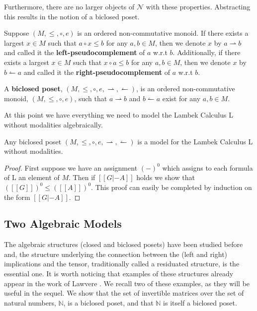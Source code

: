 \documentclass{llncs}
\newcommand{\N}{\mathcal{N}}
\newcommand{\rto}{\leftharpoonup}
\newcommand{\lto}{\rightharpoonup}
\begin{document}
Furthermore, there are no larger objects of $\N$ with these
properties.  Abstracting this results in the notion of a biclosed
poset.
\begin{definition}
  \label{def:biclosed-poset}
  Suppose $(M, \leq, \circ, e)$ is an ordered non-commutative monoid.
  If there exists a largest $x \in M$ such that $a \circ x \leq b$ for
  any $a, b \in M$, then we denote $x$ by $a \lto b$ and called it
  the \textbf{left-pseudocomplement} of $a$ w.r.t $b$.  Additionally,
  if there exists a largest $x \in M$ such that $x \circ a \leq b$ for
  any $a, b \in M$, then we denote $x$ by $b \rto a$ and called it
  the \textbf{right-pseudocomplement} of $a$ w.r.t $b$.

  A \textbf{biclosed poset}, $(M, \leq, \circ, e, \lto, \rto)$, is an  ordered non-commutative monoid, $(M, \leq, \circ, e)$, such that $a
  \lto b$ and $b \rto a$ exist for any $a,b \in M$.
\end{definition}

At this point we have everything we need to model the Lambek Calculus L without modalities algebraically.
\begin{lemma}
  \label{lemma:biclosed-poset-model-L}
  Any biclosed poset $(M, \leq, \circ, e, \lto, \rto)$ is a model for  the Lambek Calculus L without modalities.
\end{lemma}
\begin{proof}
  First suppose we have an assignment $(-)^0$ which assigns to each
  formula of L an element of $M$.  Then if $[[G |- A]]$ holds we
  show that $([[G]])^0 \leq ([[A]])^0$.  This proof can easily be
  completed by induction on the form $[[G |- A]]$.  
\end{proof}

\subsection{Two  Algebraic Models}
\label{subsec:two_example_algebraic_models}

The algebraic structures (closed and biclosed posets) have been studied before and, the structure underlying the
connection between the (left and right) implications and the tensor, traditionally  called a residuated structure, is the essential one. It is worth noticing that  examples of these structures already appear in the work of Lawvere \cite{lawvere1973}. We recall two of these  examples, as they will be useful in the sequel.  
We show that the set of invertible matrices over the set of
natural numbers, $\mathbb{N}$, is a biclosed poset, and that $\mathbb{N}$ is itself a biclosed poset.
\vspace{-10px}
\end{document}
